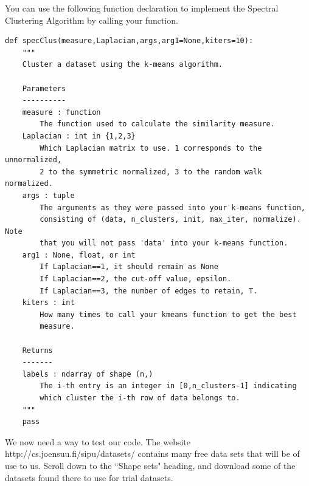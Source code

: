 You can use the following function declaration to implement the Spectral Clustering Algorithm by calling your  function.
\begin{lstlisting}
def specClus(measure,Laplacian,args,arg1=None,kiters=10):
    """
    Cluster a dataset using the k-means algorithm.

    Parameters
    ----------
    measure : function
        The function used to calculate the similarity measure.
    Laplacian : int in {1,2,3}
        Which Laplacian matrix to use. 1 corresponds to the unnormalized,
        2 to the symmetric normalized, 3 to the random walk normalized.
    args : tuple
        The arguments as they were passed into your k-means function,
        consisting of (data, n_clusters, init, max_iter, normalize). Note
        that you will not pass 'data' into your k-means function.
    arg1 : None, float, or int
        If Laplacian==1, it should remain as None
        If Laplacian==2, the cut-off value, epsilon.
        If Laplacian==3, the number of edges to retain, T.
    kiters : int
        How many times to call your kmeans function to get the best
        measure.

    Returns
    -------
    labels : ndarray of shape (n,)
        The i-th entry is an integer in [0,n_clusters-1] indicating
        which cluster the i-th row of data belongs to.
    """
    pass
\end{lstlisting}

We now need a way to test our code.  The website http://cs.joensuu.fi/sipu/datasets/ contains many free data sets that will be of use to us.  Scroll down to the ``Shape sets" heading, and download some of the datasets found there to use for trial datasets.

